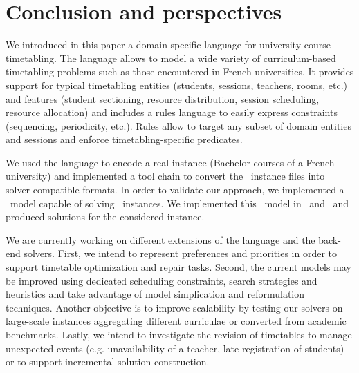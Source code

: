 \section{Conclusion and perspectives}
\label{sec:conclusion}
We introduced in this paper a domain-specific language for university course timetabling. 
The language allows to model a wide variety of curriculum-based timetabling problems
such as those encountered in French universities. 
It provides support for typical timetabling entities (students, sessions, teachers, rooms, etc.) and features (student sectioning, resource distribution, session scheduling, resource allocation) and includes a rules language to easily express constraints (sequencing, periodicity, etc.).
Rules allow to target any subset of domain entities and sessions and enforce timetabling-specific predicates.

We used the language to encode a real instance (Bachelor courses of a French university) and 
implemented a tool chain to convert the \XML\ instance files into solver-compatible formats.
In order to validate our approach, we implemented a \CSP\ model capable of solving \UTP\ instances. 
We implemented this \CSP\ model in \MINIZINC\ and \CHR\ and produced solutions for the considered instance.



We are currently working on different extensions of the language and the back-end solvers.
First, we intend to represent preferences and priorities in order to support timetable optimization and repair tasks.
Second, the current {\CP} models may be improved using dedicated scheduling constraints, search strategies and heuristics and take advantage of model simplication and reformulation techniques.
Another objective is to improve scalability by testing our solvers on large-scale instances aggregating different curriculae or converted from academic benchmarks.
Lastly, we intend to investigate the revision of timetables to manage unexpected events (e.g.  unavailability of a teacher, late registration of students) or to support incremental solution construction. 

